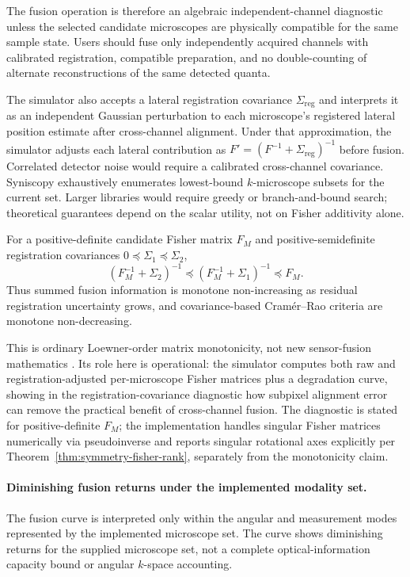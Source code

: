 The fusion operation is therefore an algebraic independent-channel diagnostic unless the selected candidate microscopes are physically compatible for the same sample state. Users should fuse only independently acquired channels with calibrated registration, compatible preparation, and no double-counting of alternate reconstructions of the same detected quanta.

The simulator also accepts a lateral registration covariance $\Sigma_{\mathrm{reg}}$ and interprets it as an independent Gaussian perturbation to each microscope's registered lateral position estimate after cross-channel alignment. Under that approximation, the simulator adjusts each lateral contribution as $F'=(F^{-1}+\Sigma_{\mathrm{reg}})^{-1}$ before fusion. Correlated detector noise would require a calibrated cross-channel covariance. Syniscopy exhaustively enumerates lowest-bound $k$-microscope subsets for the current set. Larger libraries would require greedy or branch-and-bound search; theoretical guarantees depend on the scalar utility, not on Fisher additivity alone.

\begin{remark}
\label{rem:registration-covariance-monotonicity}
For a positive-definite candidate Fisher matrix $F_M$ and positive-semidefinite registration covariances $0\preceq\Sigma_1\preceq\Sigma_2$,
\begin{equation}
  (F_M^{-1}+\Sigma_2)^{-1}
  \preceq
  (F_M^{-1}+\Sigma_1)^{-1}
  \preceq
  F_M .
\end{equation}
Thus summed fusion information is monotone non-increasing as residual registration uncertainty grows, and covariance-based Cram\'{e}r--Rao criteria are monotone non-decreasing.
\end{remark}

This is ordinary Loewner-order matrix monotonicity, not new sensor-fusion mathematics \cite{boyd-convex,fisher-fusion}. Its role here is operational: the simulator computes both raw and registration-adjusted per-microscope Fisher matrices plus a degradation curve, showing in the registration-covariance diagnostic how subpixel alignment error can remove the practical benefit of cross-channel fusion. The diagnostic is stated for positive-definite $F_M$; the implementation handles singular Fisher matrices numerically via pseudoinverse and reports singular rotational axes explicitly per Theorem~\ref{thm:symmetry-fisher-rank}, separately from the monotonicity claim.

\paragraph{Diminishing fusion returns under the implemented modality set.}
The fusion curve is interpreted only within the angular and measurement modes represented by the implemented microscope set. The curve shows diminishing returns for the supplied microscope set, not a complete optical-information capacity bound or angular $k$-space accounting.

